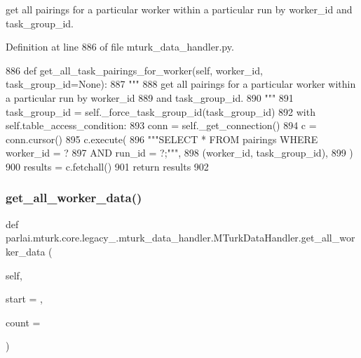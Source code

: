 \begin{DoxyVerb}get all pairings for a particular worker within a particular run by worker_id
and task_group_id.
\end{DoxyVerb}
 

Definition at line 886 of file mturk\+\_\+data\+\_\+handler.\+py.


\begin{DoxyCode}
886     \textcolor{keyword}{def }get\_all\_task\_pairings\_for\_worker(self, worker\_id, task\_group\_id=None):
887         \textcolor{stringliteral}{"""}
888 \textcolor{stringliteral}{        get all pairings for a particular worker within a particular run by worker\_id}
889 \textcolor{stringliteral}{        and task\_group\_id.}
890 \textcolor{stringliteral}{        """}
891         task\_group\_id = self.\_force\_task\_group\_id(task\_group\_id)
892         with self.table\_access\_condition:
893             conn = self.\_get\_connection()
894             c = conn.cursor()
895             c.execute(
896                 \textcolor{stringliteral}{"""SELECT * FROM pairings WHERE worker\_id = ?}
897 \textcolor{stringliteral}{                         AND run\_id = ?;"""},
898                 (worker\_id, task\_group\_id),
899             )
900             results = c.fetchall()
901             \textcolor{keywordflow}{return} results
902 
\end{DoxyCode}
\mbox{\label{classparlai_1_1mturk_1_1core_1_1legacy__2018_1_1mturk__data__handler_1_1MTurkDataHandler_a3b340b130896aab223069d783566ce3e}} 
\subsubsection{\texorpdfstring{get\+\_\+all\+\_\+worker\+\_\+data()}{get\_all\_worker\_data()}}
{\footnotesize\ttfamily def parlai.\+mturk.\+core.\+legacy\+\_.\+mturk\+\_\+data\+\_\+handler.\+M\+Turk\+Data\+Handler.\+get\+\_\+all\+\_\+worker\+\_\+data (\begin{DoxyParamCaption}\item[{}]{self,  }\item[{}]{start = {},  }\item[{}]{count = {} }\end{DoxyParamCaption})}

